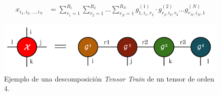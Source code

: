 \documentclass[spanish]{article}
\theoremstyle{definition}
\theoremstyle{remark}
\numberwithin{equation}{section}
\numberwithin{equation}{section} %
\begin{document}
\begin{equation}
\label{slice_representation_TT_with_vectos}
\begin{split}
x_{i_1,i_2, \ldots ,i_N}
&=\sum^{R_1}_{r_1=1}\sum^{R_2}_{r_2=1}\dots\sum^{R_N}_{r_N=1}g_{1,i_1,r_2}^{(1)} \cdot g_{r_2,i_2,r_3}^{(2)} \ldots g_{r_N,i_N,1}^{(N)}
\end{split}
\end{equation} \par
\begin{figure}[H]
 \centering
 \includegraphics[width=14cm]{img/descomposicion_tensor_train.png}
\caption[Ejemplo descomposición \textit{Tensor Train}]{\footnotesize{Ejemplo de una descomposición \textit{Tensor Train} de un tensor  de orden 4.  
}} 
\label{fig:descomposicion_tt}
\end{figure}
\end{document}
